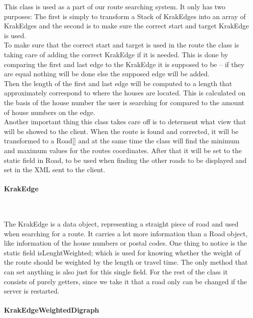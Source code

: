\documentclass[a4paper,10pt,titlepage]{article}
\begin{document}
This class is used as a part of our route searching system. It only has two purposes: The first is simply to transform a Stack of KrakEdges into an array of KrakEdges and the second is to make sure the correct start and target KrakEdge is used.\\
To make sure that the correct start and target is used in the route the class is taking care of adding the correct KrakEdge if it is needed. This is done by comparing the first and last edge to the KrakEdge it is supposed to be – if they are equal nothing will be done else the supposed edge will be added.\\
Then the length of the first and last edge will be computed to a length that approximately correspond to where the houses are located. This is calculated on the basis of the house number the user is searching for compared to the amount of house numbers on the edge.\\
Another important thing this class takes care off is to determent what view that will be showed to the client. When the route is found and corrected, it will be transformed to a Road[] and at the same time the class will find the minimum and maximum values for the routes coordinates. After that it will be set to the static field in Road, to be used when finding the other roads to be displayed and set in the XML sent to the client.\\


				
				\paragraph{KrakEdge}\mbox{}\
				
The KrakEdge\cite{sedgewickAndWayneDirectedEdge} is a data object, representing a straight piece of road and used when searching for a route. It carries a lot more information than a Road object, like information of the house numbers or postal codes. One thing to notice is the static field isLenghtWeighted; which is used for knowing whether the weight of the route should be weighted by the length or travel time. The only method that can set anything is also just for this single field. For the rest of the class it consists of purely getters, since we take it that a road only can be changed if the server is restarted.\\

				
				\paragraph{KrakEdgeWeightedDigraph}\mbox{}\
				
\end{document}
